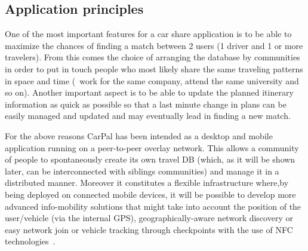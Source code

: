 \subsection{Application principles}
%
One of the most important features for a car share application is to
be able to maximize the chances of finding a match between 2 users (1
driver and 1 or more travelers).  From this comes the choice of
arranging the database by communities in order to put in touch people
who most likely share the same traveling patterns in space and time
(\eg\ work for the same company, attend the same university and so
on). Another important aspect is to be able to update the planned
itinerary information as quick as possible so that a last minute
change in plans can be easily managed and updated and may eventually
lead in finding a new match.

For the above reasons CarPal has been intended as a desktop and mobile
application running on a peer-to-peer overlay network. This allows a
community of people to spontaneously create its own travel DB (which,
as it will be shown later, can be interconnected with siblings
communities) and manage it in a distributed manner.  Moreover it
constitutes a flexible infrastructure where,by being deployed on
connected mobile devices, it will be possible to develop more advanced
info-mobility solutions that might take into account the position of
the user/vehicle (via the internal GPS), geographically-aware network
discovery or easy network join or vehicle tracking through checkpoints
with the use of NFC technologies~\cite{NFC}.

